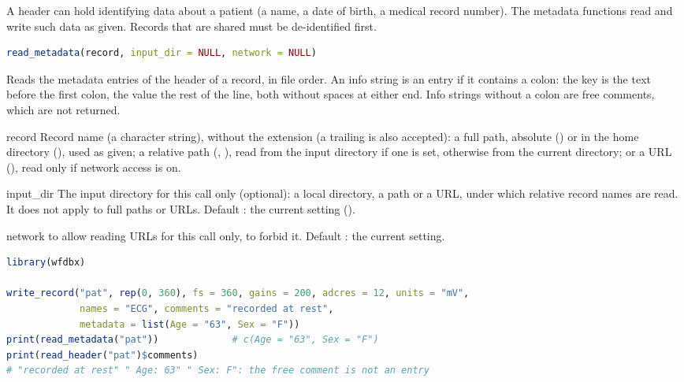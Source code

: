 \begin{phibox}
A header can hold identifying data about a patient (a name, a date of birth, a medical
record number). The metadata functions read and write such data as given. Records that
are shared must be de-identified first.
\end{phibox}

\begin{lstlisting}[language=R,style=signature]
read_metadata(record, input_dir = NULL, network = NULL)
\end{lstlisting}
Reads the metadata entries of the header of a record, in file order. An info string is an
entry if it contains a colon: the key is the text before the first colon, the value the
rest of the line, both without spaces at either end. Info strings without a colon are free
comments, which are not returned.
\begin{params}
\item[record] Record name (a character string), without the  extension (a
  trailing  is also accepted): a full path, absolute
  () or in the home directory
  (), used as given; a relative path (,
  ), read from the input directory if one is set, otherwise from the
  current directory; or a URL (),
  read only if network access is on.
\item[input\_dir] The input directory for this call only (optional): a local directory, a
  \code{\textasciitilde} path or a URL, under which relative record names are read. It does not
  apply to full paths or URLs. Default : the current setting
  ().
\item[network]  to allow reading URLs for this call only,  to
  forbid it. Default : the current setting.
\end{params}
\begin{lstlisting}[language=R,style=example]
library(wfdbx)

write_record("pat", rep(0, 360), fs = 360, gains = 200, adcres = 12, units = "mV",
             names = "ECG", comments = "recorded at rest",
             metadata = list(Age = "63", Sex = "F"))
print(read_metadata("pat"))             # c(Age = "63", Sex = "F")
print(read_header("pat")$comments)
# "recorded at rest" " Age: 63" " Sex: F": the free comment is not an entry
\end{lstlisting}

